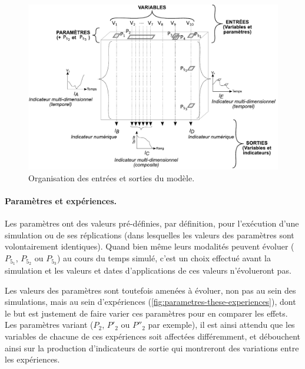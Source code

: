 \begin{figure}[H]
	\includegraphics[width=\linewidth]{img/schemas_params_3_complet.pdf}
	\caption{Organisation des entrées et sorties du modèle.} 
	\label{fig:parametres-these-complet} 
\end{figure}

\paragraph{Paramètres et expériences.}
Les paramètres ont des valeurs pré-définies, par définition, pour l'exécution d'une simulation ou de ses réplications (dans lesquelles les valeurs des paramètres sont volontairement identiques).
Quand bien même leurs modalités peuvent évoluer ($P_{5_{1}}$, $P_{5_{2}}$ ou $P_{5_{3}}$) au cours du temps simulé, c'est un choix effectué avant la simulation et les valeurs et dates d'applications de ces valeurs n'évolueront pas.

Les valeurs des paramètres sont toutefois amenées à évoluer, non pas au sein des simulations, mais au sein d'expériences (\cref{fig:parametres-these-experiences}), dont le but est justement de faire varier ces paramètres pour en comparer les effets.
Les paramètres variant ($P_2$, $P'_2$ ou $P''_2$ par exemple), il est ainsi attendu que les variables de chacune de ces expériences soit affectées différemment, et débouchent ainsi sur la production d'indicateurs de sortie qui montreront des variations entre les expériences.

